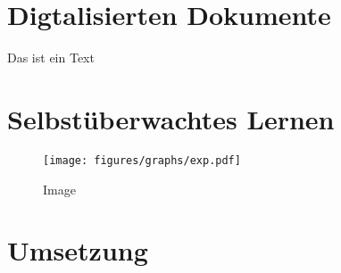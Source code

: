 \chapter{Digtalisierten Dokumente}
Das ist ein Text

\chapter{Selbstüberwachtes Lernen}

\begin{figure}
    \texttt{[image: figures/graphs/exp.pdf]} 
    \caption{Image}
  \end{figure}

\chapter{Umsetzung}